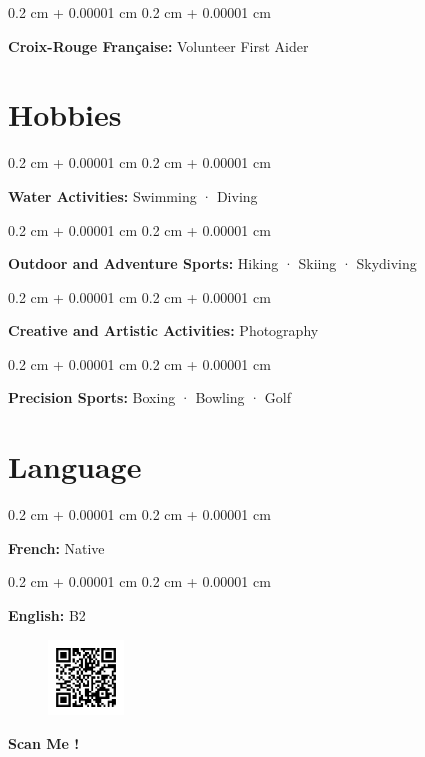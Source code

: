\documentclass[10pt, letterpaper]{article}
\newenvironment{onecolentry}{
    \begin{adjustwidth}{
        0.2 cm + 0.00001 cm
    }{
        0.2 cm + 0.00001 cm
    }
}{
    \end{adjustwidth}
} %
\begin{document}
    \begin{onecolentry}
        \textbf{Croix-Rouge Française:} Volunteer First Aider
    \end{onecolentry}

    \section{Hobbies}
        \begin{onecolentry}
            \textbf{Water Activities:} Swimming · Diving
        \end{onecolentry}
        \vspace{0.2 cm}

        \begin{onecolentry}
            \textbf{Outdoor and Adventure Sports:} Hiking · Skiing · Skydiving
        \end{onecolentry}
        \vspace{0.2 cm}
        
        \begin{onecolentry}
            \textbf{Creative and Artistic Activities:} Photography
        \end{onecolentry}
        \vspace{0.2 cm}

        \begin{onecolentry}
            \textbf{Precision Sports:} Boxing · Bowling · Golf
        \end{onecolentry}
        \vspace{0.2 cm}


    \section{Language}
        \begin{onecolentry}
            \textbf{French:} Native
        \end{onecolentry}
        \vspace{0.2 cm}

        \begin{onecolentry}
            \textbf{English:} B2
        \end{onecolentry}
        \vspace{0.2 cm}



    \begin{figure}[th]
        \centering
        \includegraphics[width=2cm, height=2cm]{qr_code_cv.png}
    \end{figure}
    \begin{center}
            \textbf{Scan Me !}
    \end{center}
\end{document}
